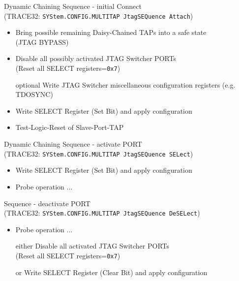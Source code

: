 \documentclass[aspectratio=169,12pt]{beamer}
\begin{document}
\begin{frame}{Dynamic Chaining}
Sequence - initial Connect\\(TRACE32: \texttt{SYStem.CONFIG.MULTITAP JtagSEQuence Attach})
\begin{itemize}
\item Bring possible remaining Daisy-Chained TAPs into a safe state\\(JTAG BYPASS)
\item Disable all possibly activated JTAG Switcher PORTs\\(Reset all SELECT registers=\texttt{0x7})
\item [optional] Write JTAG Switcher miscellaneous configuration registers (e.g. TDOSYNC)
\item Write SELECT Register (Set Bit) and apply configuration
\item Test-Logic-Reset of Slave-Port-TAP
\end{itemize}
\end{frame}

\begin{frame}{Dynamic Chaining}
Sequence - activate PORT\\ (TRACE32: \texttt{SYStem.CONFIG.MULTITAP JtagSEQuence SELect})
\begin{itemize}
\item Write SELECT Register (Set Bit) and apply configuration
\item Probe operation ...
\end{itemize}
Sequence - deactivate PORT\\ (TRACE32: \texttt{SYStem.CONFIG.MULTITAP JtagSEQuence DeSELect})
\begin{itemize}
\item Probe operation ...
\item [either]Disable all activated JTAG Switcher PORTs\\(Reset all SELECT registers=\texttt{0x7})
\item [or]Write SELECT Register (Clear Bit) and apply configuration
\end{itemize}
\end{frame}
\end{document}
